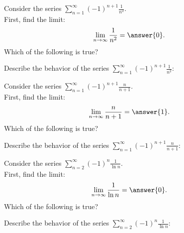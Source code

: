 \documentclass{ximera}
\begin{document}
\begin{problem}
Consider the series $\displaystyle{\sum_{n=1}^\infty (-1)^{n+1} \frac{1}{n^2}}$.\\
First, find the limit:
\[
\lim_{n\to\infty} \frac{1}{n^2} = \answer{0}.
\]
Which of the following is true?
\begin{multipleChoice}
\end{multipleChoice}


Describe the behavior of the series $\displaystyle{\sum_{n=1}^\infty (-1)^{n+1} \frac{1}{n^2}:}$
\begin{multipleChoice}
\end{multipleChoice}

\end{problem}



\begin{problem}
Consider the series $\displaystyle{\sum_{n=1}^\infty (-1)^{n+1} \frac{n}{n+1}}$.\\
First, find the limit:
\[
\lim_{n\to\infty} \frac{n}{n+1} = \answer{1}.
\]
Which of the following is true?
\begin{multipleChoice}
\end{multipleChoice}


Describe the behavior of the series $\displaystyle{\sum_{n=1}^\infty (-1)^{n+1} \frac{n}{n+1}:}$
\begin{multipleChoice}
\end{multipleChoice}

\end{problem}


\begin{problem}
Consider the series $\displaystyle{\sum_{n=2}^\infty (-1)^n \frac{1}{\ln n}}$.\\
First, find the limit:
\[
\lim_{n\to\infty} \frac{1}{\ln n} = \answer{0}.
\]
Which of the following is true?
\begin{multipleChoice}
\end{multipleChoice}


Describe the behavior of the series $\displaystyle{\sum_{n=2}^\infty (-1)^n \frac{1}{\ln n}:}$
\begin{multipleChoice}
\end{multipleChoice}

\end{problem}
\end{document}

